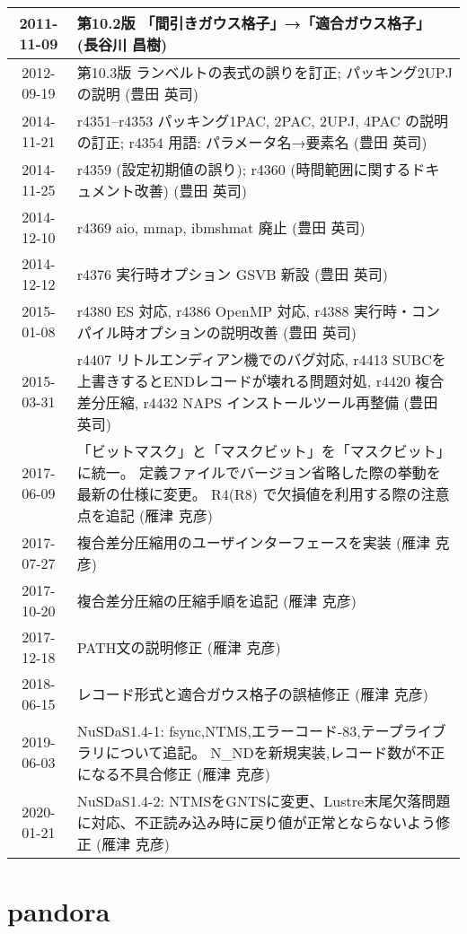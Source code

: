 \documentclass[10pt,a4paper]{report}
\newcommand{\HEADINGS}{%
	\pagestyle{myheadings}%
	\markright{NuSDaS 1.4-2(2020-01-21)}%
 }
\newcommand{\Chapter}[1]{\chapter{#1}\HEADINGS}
\begin{document}
\begin{center}
\begin{tabular}{|c|p{}|}
2011-11-09 & 第10.2版 「間引きガウス格子」→「適合ガウス格子」
(長谷川 昌樹)\\
\hline
2012-09-19 & 第10.3版 ランベルトの表式の誤りを訂正;
 パッキング2UPJの説明
(豊田 英司)\\
\hline
2014-11-21 & r4351--r4353 パッキング1PAC, 2PAC, 2UPJ, 4PAC の説明の訂正;
 r4354 用語: パラメータ名→要素名
(豊田 英司) \\
\hline
2014-11-25 & r4359 (設定初期値の誤り);
r4360 (時間範囲に関するドキュメント改善)
(豊田 英司) \\
\hline
2014-12-10 & r4369 aio, mmap, ibmshmat 廃止 (豊田 英司) \\
\hline
2014-12-12 & r4376 実行時オプション GSVB 新設 (豊田 英司) \\
\hline
2015-01-08 & r4380 ES 対応, r4386 OpenMP 対応,
	r4388 実行時・コンパイル時オプションの説明改善 (豊田 英司) \\
\hline
2015-03-31 & r4407 リトルエンディアン機でのバグ対応,
r4413 SUBCを上書きするとENDレコードが壊れる問題対処,
r4420 複合差分圧縮,
r4432 NAPS インストールツール再整備
(豊田 英司) \\
\hline
2017-06-09 & 「ビットマスク」と「マスクビット」を「マスクビット」に統一。
定義ファイルでバージョン省略した際の挙動を最新の仕様に変更。
R4(R8) で欠損値を利用する際の注意点を追記
(雁津 克彦) \\
\hline
2017-07-27 & 複合差分圧縮用のユーザインターフェースを実装
(雁津 克彦) \\
\hline
2017-10-20 & 複合差分圧縮の圧縮手順を追記
(雁津 克彦) \\
\hline
2017-12-18 & PATH文の説明修正
(雁津 克彦) \\
\hline
2018-06-15 & レコード形式と適合ガウス格子の誤植修正
(雁津 克彦) \\
\hline
2019-06-03 & NuSDaS1.4-1:
fsync,NTMS,エラーコード-83,テープライブラリについて追記。
N\_NDを新規実装,レコード数が不正になる不具合修正
(雁津 克彦) \\
\hline
2020-01-21 & NuSDaS1.4-2:
NTMSをGNTSに変更、Lustre末尾欠落問題に対応、不正読み込み時に戻り値が正常とならないよう修正
(雁津 克彦) \\
\hline
\end{tabular}
\end{center}

 \tableofcontents
 
 
 
 
 
 
 
 \sloppy
 
 
 \fussy
 
\appendix
 
 
 
 
 
 \sloppy
 
 \fussy
 \Chapter{pandora}
 
 
 
 
 
\end{document}
